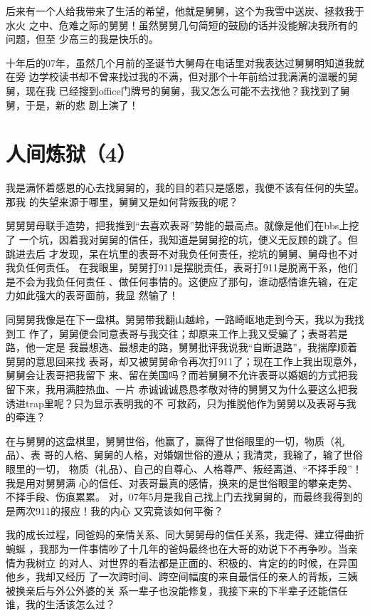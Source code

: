 \documentclass[12pt]{book}
\begin{document}
后来有一个人给我带来了生活的希望，他就是舅舅，这个为我雪中送炭、拯救我于水火
之中、危难之际的舅舅！虽然舅舅几句简短的鼓励的话并没能解决我所有的问题，但至
少高三的我是快乐的。

十年后的07年，虽然几个月前的圣诞节大舅母在电话里对我表达过舅舅明知道我就在旁
边学校读书却不曾来找过我的不满，但对那个十年前给过我满满的温暖的舅舅，现在我
已经搜到office门牌号的舅舅，我又怎么可能不去找他？我找到了舅舅，于是，新的悲
剧上演了！
\section{人间炼狱（4）}
\label{sec-10-4}

我是满怀着感恩的心去找舅舅的，我的目的若只是感恩，我便不该有任何的失望。那我
的失望来源于哪里，舅舅又是如何背叛我的呢？

舅舅舅母联手造势，把我推到“去喜欢表哥”势能的最高点。就像是他们在bbs上挖了
一个坑，因着我对舅舅的信任，我知道是舅舅挖的坑，便义无反顾的跳了。但跳进去后
才发现，呆在坑里的表哥不对我负任何责任，挖坑的舅舅、舅母也不对我负任何责任。
在我眼里，舅舅打911是摆脱责任，表哥打911是脱离干系，他们是不会为我负任何责任
、做任何事情的。这便应了那句，谁动感情谁先输，在定力如此强大的表哥面前，我显
然输了！

同舅舅我像是在下一盘棋。舅舅带我翻山越岭，一路崎岖地走到今天，我以为我找到工
作了，舅舅便会同意表哥与我交往；却原来工作上我又受骗了；表哥若是路，他一定是
我最想选、最想走的路，舅舅批评我说我“自断退路”，我揣摩顺着舅舅的意思回来找
表哥，却又被舅舅命令再次打911了；现在工作上我出现意外，舅舅会让表哥把我留下
来、留在美国吗？而若舅舅不允许表哥以婚姻的方式把我留下来，我用满腔热血、一片
赤诚诚诚恳恳孝敬对待的舅舅又为什么要这么把我诱进trap里呢？只为显示表明我的不
可救药，只为推脱他作为舅舅以及表哥与我的牵连？

在与舅舅的这盘棋里，舅舅世俗，他赢了，赢得了世俗眼里的一切，物质（礼品）、表
哥的人格、舅舅的人格，对婚姻世俗的遵从；我清灵，我输了，输了世俗眼里的一切，
物质（礼品）、自己的自尊心、人格尊严、叛经离道、“不择手段”！我是用对舅舅满
心的信任、对表哥最真的感情，换来的是世俗眼里的攀亲走势、不择手段、伤痕累累。
对，07年5月是我自己找上门去找舅舅的，而最终我得到的是两次911的报应！我的内心
又究竟该如何平衡？

我的成长过程，同爸妈的亲情关系、同大舅舅母的信任关系，我走得、建立得曲折蜿蜒
，我那为一件事情吵了十几年的爸妈最终也在大哥的劝说下不再争吵。当亲情为我树立
的对人、对世界的看法都是正面的、积极的、肯定的的时候，在异国他乡，我却又经历
了一次跨时间、跨空间幅度的来自最信任的亲人的背叛，三姨被换亲后与外公外婆的关
系一辈子也没能修复，我接下来的下半辈子还能信任谁，我的生活该怎么过？
\end{document}

